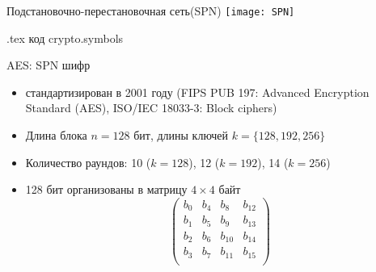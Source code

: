 \documentclass[usenames,dvipsnames,8pt,aspectratio=169]{beamer}
\begin{document}
\begin{frame}{Подстановочно-перестановочная сеть(SPN)}
\centering
{}
\texttt{[image: SPN]}

\vfill
\small
{\color{gray} {.tex код crypto.symbols}} 

\end{frame}

\begin{frame}{AES:  SPN шифр}
\Large 
\begin{itemize}
	\itemsep 10pt
	\item стандартизирован в 2001 году (FIPS PUB 197: Advanced Encryption Standard (AES), ISO/IEC 18033-3: Block ciphers)
	\item Длина блока $n = 128 $ бит, длины ключей $k = \{128, 192, 256 \}$
	\item Количество раундов: 10 ($k = 128$), 12 ($k=192$), 14 ($k=256$)
	\item 128 бит организованы в матрицу $4 \times 4$ байт
	\[
	\begin{pmatrix}
	b_0 & b_4 & b_8 & b_{12} \\
	b_1 & b_5 & b_9 & b_{13} \\
	b_2 & b_6 & b_{10} & b_{14} \\
	b_3 & b_7 & b_{11} & b_{15}  \\
	\end{pmatrix}
	\]
\end{itemize}
	
\end{frame}
\end{document}
